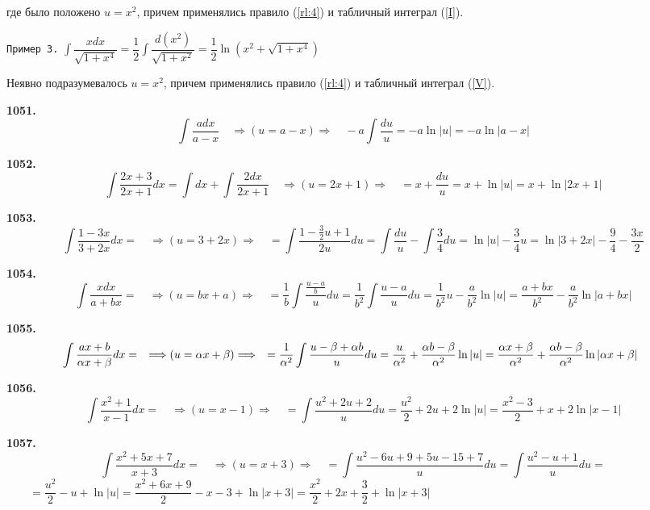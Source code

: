 \documentclass[12pt]{article}
\begin{document}
	\hspace{-3mm}где было положено $u=x^2$, причем применялись правило (\ref{rl:4}) и табличный интеграл (\ref{I}).\vspace{3mm}
	
	{\tt Пример 3.} $\displaystyle\int \dfrac{xdx}{\sqrt{1+x^4}} = \dfrac{1}{2}\int \dfrac{d(x^2)}{\sqrt{1+x^2}} = \dfrac{1}{2}\ln(x^2+\sqrt{1+x^4})$
	
	\hspace{-3mm} Неявно подразумевалось $u=x^2$, причем применялись правило (\ref{rl:4}) и табличный интеграл (\ref{V}).
	
	
	
	\medskip
	{\bf 1051.} \[
		\int \dfrac{a dx}{a-x} \quad \Longrightarrow(u = a-x)  \Longrightarrow\quad -a\int \dfrac{du}{u} =-a\ln |u| = -a\ln|a-x|
	\]
	
	{\bf 1052.} \[
		\int \dfrac{2x+3}{2x+1}dx =\int dx + \int \dfrac{2dx}{2x+1}\quad \Longrightarrow(u = 2x+1)  \Longrightarrow\quad= x+\dfrac{du}{u} = x +\ln|u| = x+\ln|2x+1|
	\]
	
	{\bf 1053.} \[
		\int \dfrac{1-3x}{3+2x} dx =\quad \Longrightarrow(u = 3+2x)  \Longrightarrow\quad = \int \dfrac{1 - \frac{3}{2}u + 1}{2u}du = \int \dfrac{du}{u} - \int \dfrac{3}{4}du = \ln|u| - \dfrac{3}{4}u = \ln|3+2x| - \dfrac{9}{4} - \dfrac{3x}{2}
	\]
	
	{\bf 1054.} \[
		\int \dfrac{x dx}{a+bx}= \quad \Longrightarrow(u = bx + a)  \Longrightarrow\quad = \dfrac{1}{b}\int \dfrac{\frac{u-a}{b}}{u}du = \dfrac{1}{b^2}\int\dfrac{u-a}{u}du = \dfrac{1}{b^2}u - \dfrac{a}{b^2}\ln|u| = \dfrac{a+bx}{b^2} - \dfrac{a}{b^2}\ln|a+bx|
	\]
	
	{\bf 1055.} \[
		\hspace{-2mm}\int\dfrac{ax+b}{\alpha x +\beta}dx= \quad \Longrightarrow(u = \alpha x +\beta)  \Longrightarrow\quad = \dfrac{1}{\alpha^2}\int \dfrac{u-\beta+\alpha b}{u}du = \dfrac{u}{\alpha^2} + \dfrac{\alpha b -\beta}{\alpha^2}\ln|u| = \dfrac{\alpha x+\beta}{\alpha^2} +\dfrac{\alpha b - \beta}{\alpha^2}\ln|\alpha x+\beta|
	\]
	
	{\bf 1056.} \[
		\int \dfrac{x^2+1}{x-1}dx=\quad \Longrightarrow(u = x-1)  \Longrightarrow\quad = \int \dfrac{u^2+2u+2}{u}du = \dfrac{u^2}{2} + 2u +2\ln|u| = \dfrac{x^2-3}{2} +x +2\ln|x-1|
	\]
	
	{\bf 1057.} \[
		\int\dfrac{x^2+5x+7}{x+3}dx= \quad \Longrightarrow(u = x+3)  \Longrightarrow\quad = \int \dfrac{u^2-6u+9+5u-15+7}{u}du = \int\dfrac{u^2-u+1}{u}du =
	\]
	$
	\qquad= \dfrac{u^2}{2} - u +\ln|u| = \dfrac{x^2+6x+9}{2} - x-3 +\ln|x+3| = \dfrac{x^2}{2} +2x +\dfrac{3}{2} +\ln|x+3|
	$
	\medskip
	
\end{document}
